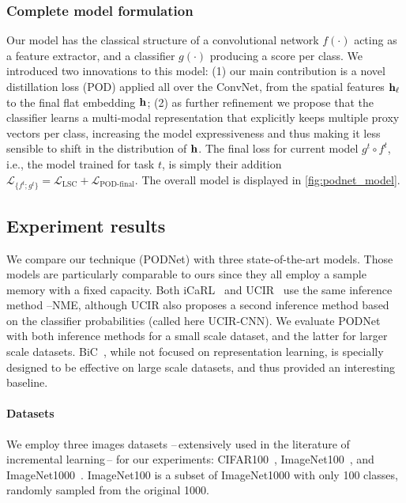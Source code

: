 \subsubsection{Complete model formulation}
\label{sec:podnet_modelsummary}

Our model has the classical structure of a convolutional network $f(\cdot)$ acting as a feature
extractor, and a classifier $g(\cdot)$ producing a score per class. We introduced two innovations to
this model: (1) our main contribution is a novel distillation loss (POD) applied all over the
\ac{ConvNet}, from the spatial features $\mathbf{h}_\ell$ to the final flat embedding $\mathbf{h}$; (2) as further
refinement we propose that the classifier learns a multi-modal representation that explicitly keeps
multiple proxy vectors per class, increasing the model expressiveness and thus making it less
sensible to shift in the distribution of $\mathbf{h}$. The final loss for current model $g^t \circ f^t$,
i.e., the model trained for task $t$, is simply their addition $\mathcal{L}_{\{f^t; g^t\}} =
    \mathcal{L}_\textrm{LSC} + \mathcal{L}_\textrm{POD-final}$. The overall model is displayed in
\autoref{fig:podnet_model}.

\subsection{Experiment results}
\label{sec:podnet_exp}

We compare our technique (\ac{PODNet}) with three state-of-the-art models. Those models are particularly
comparable to ours since they all employ a sample memory with a fixed capacity. Both
iCaRL~\citep{rebuffi2017icarl} and UCIR~\citep{hou2019ucir} use the same inference method
--\ac{NME}, although UCIR also proposes a second inference method
based on the classifier probabilities (called here UCIR-CNN). We evaluate \ac{PODNet} with both inference
methods for a small scale dataset, and the latter for larger scale datasets.
BiC~\citep{wu2019bias_correction}, while not focused on representation learning, is specially
designed to be effective on large scale datasets, and thus provided an interesting baseline.

\paragraph{Datasets} We employ three images datasets --\,extensively used in the literature of
incremental learning\,-- for our experiments: CIFAR100~\citep{krizhevskycifar100},
ImageNet100~\citep{deng2009imagenet,hou2019ucir,wu2019bias_correction}, and
ImageNet1000~\citep{deng2009imagenet}. ImageNet100 is a subset of ImageNet1000 with only 100
classes, randomly sampled from the original 1000.

